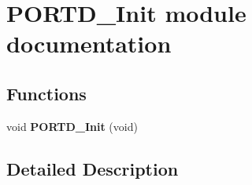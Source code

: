 \hypertarget{group___p_o_r_t_d___init__module}{}\section{P\+O\+R\+T\+D\+\_\+\+Init module documentation}
\label{group___p_o_r_t_d___init__module}
\subsection*{Functions}
\begin{DoxyCompactItemize}
\item 
void {\bfseries P\+O\+R\+T\+D\+\_\+\+Init} (void)\hypertarget{group___p_o_r_t_d___init__module_gacdcce5a725e2873ca1b4fa1ba3c41926}{}\label{group___p_o_r_t_d___init__module_gacdcce5a725e2873ca1b4fa1ba3c41926}

\end{DoxyCompactItemize}


\subsection{Detailed Description}

